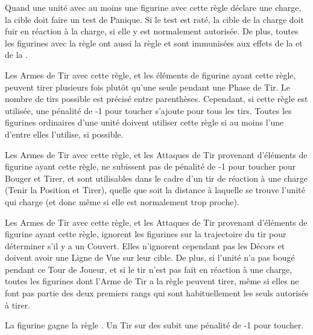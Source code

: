 
Quand une unité avec au moins une figurine avec cette règle déclare une charge, la cible doit faire un test de Panique. Si le test est raté, la cible de la charge doit fuir en réaction à la charge, si elle y est normalement autorisée. De plus, toutes les figurines avec la règle \terror{} ont aussi la règle \fear{} et sont immunisées aux effets de la \fear{} et de la \terror{}.


Les Armes de Tir avec cette règle, et les éléments de figurine ayant cette règle, peuvent tirer plusieurs fois plutôt qu'une seule pendant une Phase de Tir. Le nombre de tirs possible est précisé entre parenthèses. Cependant, si cette règle est utilisée, une pénalité de -1 pour toucher s'ajoute pour tous les tirs. Toutes les figurines ordinaires d'une unité doivent utiliser cette règle si au moins l'une d'entre elles l'utilise, si possible.


Les Armes de Tir avec cette règle, et les Attaques de Tir provenant d'éléments de figurine ayant cette règle, ne subissent pas de pénalité de -1 pour toucher pour Bouger et Tirer, et sont utilisables dans le cadre d'un tir de réaction à une charge (Tenir la Position et Tirer), quelle que soit la distance à laquelle se trouve l'unité qui charge (et donc même si elle est normalement trop proche).


Les Armes de Tir avec cette règle, et les Attaques de Tir provenant d'éléments de figurine ayant cette règle, ignorent les figurines sur la trajectoire du tir pour déterminer s'il y a un Couvert. Elles n'ignorent cependant pas les Décors et doivent avoir une Ligne de Vue sur leur cible. De plus, si l'unité n'a pas bougé pendant ce Tour de Joueur, et si le tir n'est pas fait en réaction à une charge, toutes les figurines dont l'Arme de Tir a la règle \volleyfire{} peuvent tirer, même si elles ne font pas partie des deux premiers rangs qui sont habituellement les seuls autorisés à tirer.


La figurine gagne la règle \lighttroops{}. Un Tir sur des \skirmishers{} subit une pénalité de -1 pour toucher.

